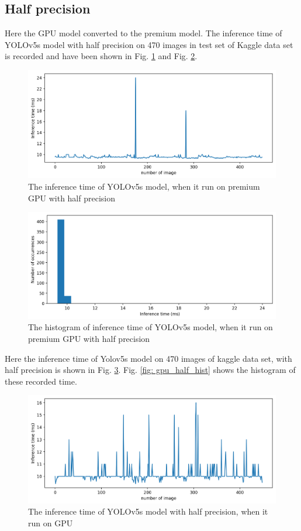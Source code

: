 \documentclass[12pt,a4paper]{article}
\begin{document}
\subsection*{Half precision}
Here the GPU model converted to the premium model. The inference time of YOLOv5s model with half precision on 470 images in test set of Kaggle data set is recorded and have been shown in Fig. \ref{fig: gpuproh} and Fig. \ref{fig: gpuproh_hist}.
\begin{figure}[H]
    \centering
    \includegraphics[width=15cm]{figures/proGPU_half.png}
    \caption{The inference time of YOLOv5s model, when it run on premium GPU with half precision}
    \label{fig: gpuproh}
\end{figure}
\begin{figure}[H]
    \centering
    \includegraphics[width=15cm]{figures/proGPU_half_hist.png}
    \caption{The histogram of inference time of YOLOv5s model, when it run on premium GPU with half precision}
    \label{fig: gpuproh_hist}
\end{figure}
Here the inference time of Yolov5s model on 470 images of kaggle data set, with half precision is shown in Fig. \ref{fig: gpu_half}. Fig. \ref{fig: gpu_half_hist} shows the histogram of these recorded time.
\begin{figure}[H]
    \centering
    \includegraphics[width=15cm]{figures/GPU_infTime_half.png}
    \caption{The inference time of YOLOv5s model with half precision, when it run on GPU}
    \label{fig: gpu_half}
\end{figure}
\end{document}
